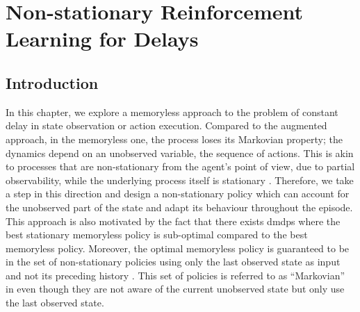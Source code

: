 \chapter{Non-stationary Reinforcement Learning for Delays}
\label{chap:lifelong}


\section{Introduction}
In this chapter, we explore a memoryless approach to the problem of constant delay in state observation or action execution.
Compared to the augmented approach, in the memoryless one, the process loses its Markovian property; the dynamics depend on an unobserved variable, the sequence of actions. 
This is akin to processes that are non-stationary from the agent's point of view, due to partial observability, while the underlying process itself is stationary \cite[Section~2.1]{khetarpal2020towards}. 
Therefore, we take a step in this direction and design a non-stationary policy which can account for the unobserved part of the state and adapt its behaviour throughout the episode.
This approach is also motivated by the fact that there exists \glspl{dmdp} where the best stationary memoryless policy is sub-optimal \cite[Proposition~5.2]{derman2021acting} compared to the best memoryless policy.
Moreover, the optimal memoryless policy is guaranteed to be in the set of non-stationary policies using only the last observed state as input and not its preceding history \cite[Theorem~5.1]{derman2021acting}. 
This set of policies is referred to as ``Markovian'' in \cite{derman2021acting} even though they are not aware of the current unobserved state but only use the last observed state.

